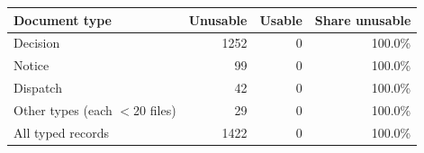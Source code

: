 \begin{tabular}{lrrr}
\toprule
Document type & Unusable & Usable & Share unusable \\
\midrule
Decision & 1252 & 0 & 100.0\% \\
Notice & 99 & 0 & 100.0\% \\
Dispatch & 42 & 0 & 100.0\% \\
Other types (each $<$20 files) & 29 & 0 & 100.0\% \\
\midrule
All typed records & 1422 & 0 & 100.0\% \\
\bottomrule
\end{tabular}
